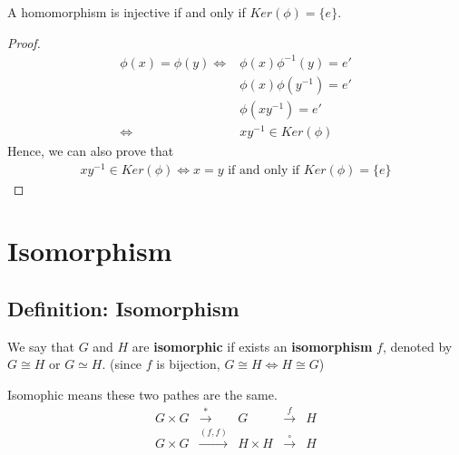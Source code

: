 \documentclass[11pt]{elegantbook}
\begin{document}
\begin{theorem}
    A homomorphism is injective if and only if $Ker(\phi)=\{e\}$.
\end{theorem}
\begin{proof}
        \begin{equation}
            \begin{aligned}
                \phi(x)=\phi(y) \Leftrightarrow	&\phi(x)\phi^{-1}(y)=e'\\
                &\phi(x)\phi(y^{-1})=e'\\
                &\phi(xy^{-1})=e'\\
                \Leftrightarrow	&xy^{-1}\in Ker(\phi)
            \end{aligned}
            \nonumber
        \end{equation}
        Hence, we can also prove that
        \begin{equation}
            \begin{aligned}
                xy^{-1}\in Ker(\phi)\Leftrightarrow x=y\text{ if and only if }Ker(\phi)=\{e\}
            \end{aligned}
            \nonumber
        \end{equation}
\end{proof}




\section{Isomorphism}
\subsection{Definition: Isomorphism}
\begin{definition}
    We say that $G$ and $H$ are \textbf{isomorphic} if exists an \textbf{isomorphism} $f$, denoted by $G\cong H$ or $G\simeq H$. (since $f$ is bijection, $G\cong H\Leftrightarrow H\cong G$)
\end{definition}


Isomophic means these two pathes are the same.
\begin{equation}
    \begin{aligned}
        G\times G& \stackrel{*}{\longrightarrow} & G &\stackrel{f}{\longrightarrow}& H\\
        G\times G& \stackrel{(f,f)}{\longrightarrow} &H\times H & \stackrel{\circ}{\longrightarrow}& H\\
    \end{aligned}
    \nonumber
\end{equation}
\end{document}
